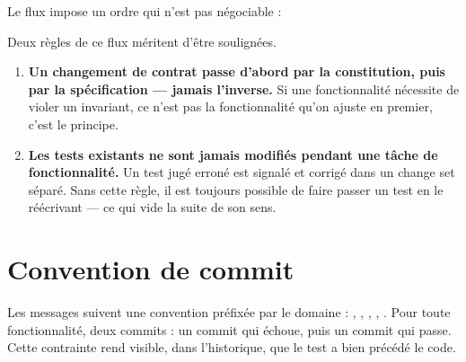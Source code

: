Le flux impose un ordre qui n'est pas négociable :

\begin{center}
\end{center}

Deux règles de ce flux méritent d'être soulignées.

\begin{enumerate}[leftmargin=1.6em]
  \item \textbf{Un changement de contrat passe d'abord par la constitution,
        puis par la spécification — jamais l'inverse.} Si une fonctionnalité
        nécessite de violer un invariant, ce n'est pas la fonctionnalité qu'on
        ajuste en premier, c'est le principe.
  \item \textbf{Les tests existants ne sont jamais modifiés pendant une tâche
        de fonctionnalité.} Un test jugé erroné est signalé et corrigé dans un
        change set séparé. Sans cette règle, il est toujours possible de faire
        passer un test en le réécrivant — ce qui vide la suite de son sens.
\end{enumerate}

\section{Convention de commit}

Les messages suivent une convention préfixée par le domaine :
, , ,
, . Pour toute fonctionnalité, deux commits : un
commit  qui échoue, puis un commit  qui
passe. Cette contrainte rend visible, dans l'historique, que le test a bien
précédé le code.

